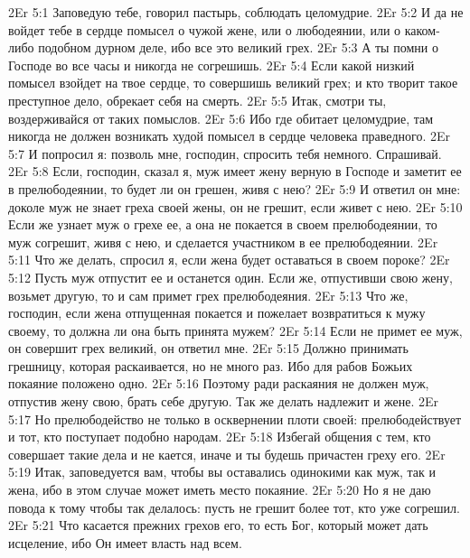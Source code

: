 \vs 2Er 5:1
Заповедую тебе, говорил пастырь, соблюдать целомудрие.
\vs 2Er 5:2
И да не войдет тебе в
сердце помысел о чужой жене, или о любодеянии, или о каком-либо подобном
дурном деле, ибо все это великий грех.
\vs 2Er 5:3
А ты помни о Господе во
все часы и никогда не согрешишь.
\vs 2Er 5:4
Если какой низкий помысел
взойдет на твое сердце, то совершишь великий грех; и кто творит такое
преступное дело, обрекает себя на смерть.
\vs 2Er 5:5
Итак, смотри ты,
воздерживайся от таких помыслов.
\vs 2Er 5:6
Ибо где обитает
целомудрие, там никогда не должен возникать худой помысел в сердце человека
праведного.
\vs 2Er 5:7
И попросил я: позволь мне,
господин, спросить тебя немного. Спрашивай.
\vs 2Er 5:8
Если, господин, сказал
я, муж имеет жену верную в Господе и заметит ее в прелюбодеянии, то будет ли
он грешен, живя с нею?
\vs 2Er 5:9
И ответил он мне: доколе
муж не знает греха своей жены, он не грешит, если живет с нею.
\vs 2Er 5:10
Если же узнает муж о
грехе ее, а она не покается в своем прелюбодеянии, то муж согрешит, живя с
нею, и сделается участником в ее прелюбодеянии.
\vs 2Er 5:11
Что же делать, спросил
я, если жена будет оставаться в своем пороке?
\vs 2Er 5:12
Пусть муж отпустит ее и
останется один. Если же, отпустивши свою жену, возьмет другую, то и сам примет
грех прелюбодеяния.
\vs 2Er 5:13
Что же, господин, если
жена отпущенная покается и пожелает возвратиться к мужу своему, то должна ли
она быть принята мужем?
\vs 2Er 5:14
Если не примет ее муж, он
совершит грех великий, он ответил мне.
\vs 2Er 5:15
Должно принимать
грешницу, которая раскаивается, но не много раз. Ибо для рабов Божьих покаяние
положено одно.
\vs 2Er 5:16
Поэтому ради раскаяния не
должен муж, отпустив жену свою, брать себе другую. Так же делать надлежит и
жене.
\vs 2Er 5:17
Но прелюбодейство не
только в осквернении плоти своей: прелюбодействует и тот, кто поступает
подобно народам.
\vs 2Er 5:18
Избегай общения с тем,
кто совершает такие дела и не кается, иначе и ты будешь причастен греху его.
\vs 2Er 5:19
Итак, заповедуется вам,
чтобы вы оставались одинокими как муж, так и жена, ибо в этом случае может
иметь место покаяние.
\vs 2Er 5:20
Но я не даю повода к тому
чтобы так делалось: пусть не грешит более тот, кто уже согрешил.
\vs 2Er 5:21
Что касается прежних
грехов его, то есть Бог, который может дать исцеление, ибо Он имеет власть над
всем.

